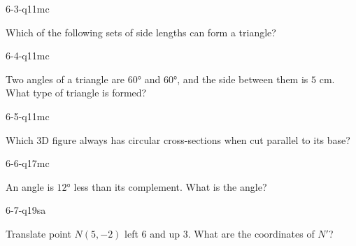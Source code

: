 \begin{practiceQuestion}{6-3-q11}{mc}
\begin{questionText}
Which of the following sets of side lengths can form a triangle?
\end{questionText}
\end{practiceQuestion}

\begin{practiceQuestion}{6-4-q11}{mc}
\begin{questionText}
Two angles of a triangle are $60°$ and $60°$, and the side between them is $5$ cm. What type of triangle is formed?
\end{questionText}
\end{practiceQuestion}

\begin{practiceQuestion}{6-5-q11}{mc}
\begin{questionText}
Which 3D figure always has circular cross-sections when cut parallel to its base?
\end{questionText}
\end{practiceQuestion}

\begin{practiceQuestion}{6-6-q17}{mc}
\begin{questionText}
An angle is $12°$ less than its complement. What is the angle?
\end{questionText}
\end{practiceQuestion}

\begin{practiceQuestion}{6-7-q19}{sa}
\begin{questionText}
Translate point $N(5, -2)$ left $6$ and up $3$. What are the coordinates of $N'$?
\end{questionText}
\end{practiceQuestion}

